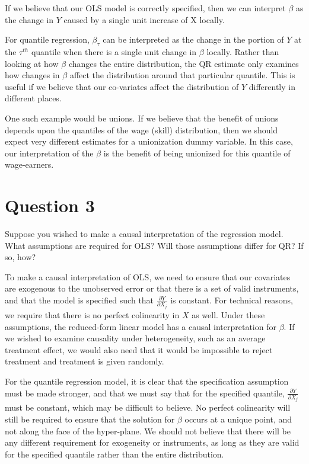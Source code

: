 \documentclass[12pt]{paper}
\newcommand{\deriv}[2]{\frac{ \partial #1}{ \partial #2}}
\begin{document}
\vspace{.3in}

If we believe that our OLS model is correctly specified, then we can
interpret $\beta$ as the change in $Y$ caused by a single unit increase of
X locally.

For quantile regression, $\beta_{\tau}$ can be interpreted as the change in
the portion of $Y$ at the $\tau^{th}$ quantile when there is a single
unit change in $\beta$ locally. Rather than looking at how $\beta$ changes the
entire distribution, the QR estimate only examines how changes in $\beta$
affect the distribution around that particular quantile. This is
useful if we believe that our co-variates affect the distribution of
$Y$ differently in different places.

One such example would be unions. If we believe that the benefit of
unions depends upon the quantiles of the wage (skill) distribution,
then we should expect very different estimates for a unionization
dummy variable. In this case, our interpretation of the $\beta$ is the
benefit of being unionized for this quantile of wage-earners. 

\section*{Question 3}

Suppose you wished to make a causal interpretation of the regression
model. What assumptions are required for OLS? Will those assumptions
differ for QR? If so, how?

\vspace{.3in}

To make a causal interpretation of OLS, we need to ensure that our
covariates are exogenous to the unobserved error or that there is a
set of valid instruments, and that the model is specified such that
$\deriv{Y}{X_j}$ is constant. For technical reasons, we require that
there is no perfect colinearity in $X$ as well.  Under these
assumptions, the reduced-form linear model has a causal interpretation
for $\beta$. If we wished to examine causality under heterogeneity, such
as an average treatment effect, we would also need that it would be
impossible to reject treatment and treatment is given randomly.

For the quantile regression model, it is clear that the specification
assumption must be made stronger, and that we must say that for the
specified quantile, $\deriv{Y}{X_j}$ must be constant, which may be
difficult to believe. No perfect colinearity will still be required to
ensure that the solution for $\beta$ occurs at a unique point, and not
along the face of the hyper-plane. We should not believe that there
will be any different requirement for exogeneity or instruments, as
long as they are valid for the specified quantile rather than the
entire distribution.
\end{document}
